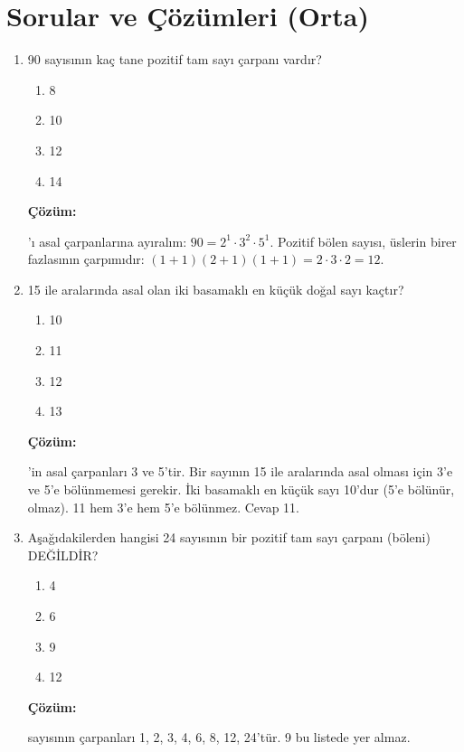 \documentclass[12pt,a4paper]{article}
\begin{document}
\section*{Sorular ve Çözümleri (Orta)}
\begin{enumerate}
  \item 90 sayısının kaç tane pozitif tam sayı çarpanı vardır?
  \begin{enumerate}
    \item 8
    \item 10
    \item 12
    \item 14
  \end{enumerate}
  \vspace{5pt}
  \par\noindent\textbf{Çözüm:}
  \par{}'ı asal çarpanlarına ayıralım: $90 = 2^1 \cdot 3^2 \cdot 5^1$. Pozitif bölen sayısı, üslerin birer fazlasının çarpımıdır: $(1+1)(2+1)(1+1) = 2 \cdot 3 \cdot 2 = 12$.\vspace{1cm}

  \item 15 ile aralarında asal olan iki basamaklı en küçük doğal sayı kaçtır?
  \begin{enumerate}
    \item 10
    \item 11
    \item 12
    \item 13
  \end{enumerate}
  \vspace{5pt}
  \par\noindent\textbf{Çözüm:}
  \par{}'in asal çarpanları 3 ve 5'tir. Bir sayının 15 ile aralarında asal olması için 3'e ve 5'e bölünmemesi gerekir. İki basamaklı en küçük sayı 10'dur (5'e bölünür, olmaz). 11 hem 3'e hem 5'e bölünmez. Cevap 11.\vspace{1cm}

  \item Aşağıdakilerden hangisi 24 sayısının bir pozitif tam sayı çarpanı (böleni) DEĞİLDİR?
  \begin{enumerate}
    \item 4
    \item 6
    \item 9
    \item 12
  \end{enumerate}
  \vspace{5pt}
  \par\noindent\textbf{Çözüm:}
  \par{} sayısının çarpanları 1, 2, 3, 4, 6, 8, 12, 24'tür. 9 bu listede yer almaz.\vspace{1cm}


\end{enumerate}
\end{document}
